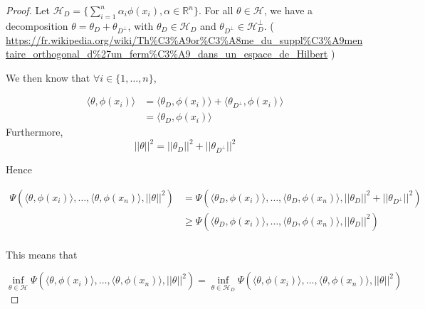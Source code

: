 \documentclass[
10pt, %
a4paper, %
oneside, %
headinclude,footinclude, %
BCOR5mm, %
]{scrartcl}
\begin{document}
\begin{proof}
    Let $ \mathcal{H}_D = \{  \sum^{n}_{i=1} \alpha_i\phi(x_i), \alpha\in \mathbb{R}^n\}$. For all $ \theta\in \mathcal{H} $, we have a decomposition $ \theta = \theta_D+ \theta_{D^{\perp}}$, with $ \theta_D \in \mathcal{H}_D $ and $ \theta_{D^{\perp}} \in \mathcal{H}_D^{\perp} $. ( \url{https://fr.wikipedia.org/wiki/Th%C3%A9or%C3%A8me_du_suppl%C3%A9mentaire_orthogonal_d%27un_ferm%C3%A9_dans_un_espace_de_Hilbert} )

    We then know that $\forall i\in \{1, \dots, n\}$,
    
    \begin{equation*}
	\begin{aligned}
	    \langle \theta, \phi(x_i) \rangle &= \langle \theta_D, \phi(x_i) \rangle+ \langle \theta_{D^{\perp}}, \phi(x_i) \rangle\\
	    &= \langle \theta_D, \phi(x_i) \rangle
	\end{aligned}
    \end{equation*}
    Furthermore,
    \begin{equation*}
	|| \theta||^2 = || \theta_D||^2+ || \theta_{D^{\perp}}||^2
    \end{equation*}

    Hence

    \begin{equation*}
        \begin{aligned}
            \label{eq:}
	    \Psi(\langle\theta,\phi(x_i) \rangle, \dots, \langle\theta, \phi(x_n) \rangle, ||\theta||^2)&=\Psi(\langle\theta_D,\phi(x_i) \rangle, \dots, \langle\theta_D, \phi(x_n) \rangle, || \theta_D||^2+ || \theta_{D^{\perp}}||^2)\\
	    &\geq \Psi(\langle\theta_D,\phi(x_i) \rangle, \dots, \langle\theta_D, \phi(x_n) \rangle, || \theta_D||^2)\\
        \end{aligned}
    \end{equation*}

    This means that

    \begin{equation*}
	\inf_{ \theta\in \mathcal{H} }\Psi(\langle\theta,\phi(x_i) \rangle, \dots, \langle\theta, \phi(x_n) \rangle, ||\theta||^2)  = \inf_{ \theta\in \mathcal{H}_D }\Psi(\langle\theta,\phi(x_i) \rangle, \dots, \langle\theta, \phi(x_n) \rangle, ||\theta||^2)
    \end{equation*}
    
\end{proof}
\end{document}
